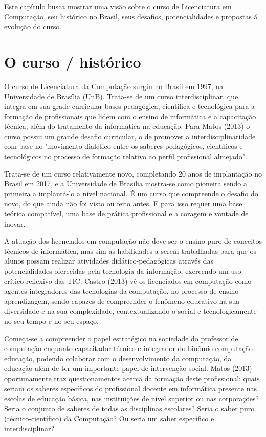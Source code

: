 
Este capítulo busca mostrar uma visão sobre o curso de Licenciatura em Computação, seu histórico no Brasil, seus desafios, potencialidades e propostas á evolução do curso.

\section{O curso / histórico}%
 
O curso de Licenciatura da Computação surgiu no Brasil em 1997, na Universidade de Brasília (UnB). Trata-se de um curso interdisciplinar, que integra em sua grade curricular bases pedagógica, científica e tecnológica para a formação de profissionais que lidem com o ensino de informática e a capacitação técnica, além do tratamento da informática na educação. Para Matos (2013) o curso possui um grande desafio curricular, o de promover a interdisciplinaridade com base no "movimento dialético entre os saberes pedagógicos, científicos e tecnológicos no processo de formação relativo ao perfil profissional almejado".

Trata-se de um curso relativamente novo, completando 20 anos de implantação no Brasil em 2017, e a Universidade de Brasilia mostra-se como pioneira sendo a primeira a implantá-lo a nível nacional. É um curso que compreende o desafio do novo, do que ainda não foi visto ou feito antes. E para isso requer uma base teórica compatível, uma base de prática profissional e a coragem e vontade de inovar.

A atuação dos licenciados em computação não deve ser o ensino puro de conceitos técnicos de informática, mas sim as habilidades a serem trabalhadas para que os alunos possam realizar atividades didático-pedagógicas através das potencialidades oferecidas pela tecnologia da informação, exercendo um uso crítico-reflexivo das TIC. Castro (2013) vê os licenciados em computação como agentes integradores das tecnologias da computação, no processo de ensino-aprendizagem, sendo capazes de compreender o fenômeno educativo na sua diversidade e na sua complexidade, contextualizando-o social e tecnologicamente no seu tempo e no seu espaço.
 
Começa-se a compreender o papel estratégico na sociedade do professor de computação enquanto capacitador técnico e integrador do binômio computação-educação, podendo colaborar com o desenvolvimento da computação, da educação além de ter um importante papel de intervenção social. Matos (2013) oportunamente traz questionamentos acerca da formação deste profissional: quais seriam os saberes específicos do profissional docente em informática presente nas escolas de educação básica, nas instituições de nível superior ou nas corporações? Seria o conjunto de saberes de todas as disciplinas escolares? Seria o saber puro (técnico-científico) da Computação? Ou seria um saber específico e interdisciplinar?
 
